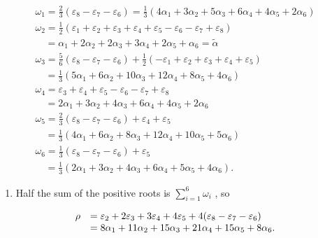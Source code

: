 \[
\begin{array}{l} \omega_ {1} = \frac {2}{3} (\varepsilon_ {8} - \varepsilon_ {7} - \varepsilon_ {6}) = \frac {1}{3} (4 \alpha_ {1} + 3 \alpha_ {2} + 5 \alpha_ {3} + 6 \alpha_ {4} + 4 \alpha_ {5} + 2 \alpha_ {6}) \\ \omega_ {2} = \frac {1}{2} (\varepsilon_ {1} + \varepsilon_ {2} + \varepsilon_ {3} + \varepsilon_ {4} + \varepsilon_ {5} - \varepsilon_ {6} - \varepsilon_ {7} + \varepsilon_ {8}) \\ \quad = \alpha_ {1} + 2 \alpha_ {2} + 2 \alpha_ {3} + 3 \alpha_ {4} + 2 \alpha_ {5} + \alpha_ {6} = \tilde {\alpha} \\ \omega_ {3} = \frac {5}{6} (\varepsilon_ {8} - \varepsilon_ {7} - \varepsilon_ {6}) + \frac {1}{2} (- \varepsilon_ {1} + \varepsilon_ {2} + \varepsilon_ {3} + \varepsilon_ {4} + \varepsilon_ {5}) \\ \quad = \frac {1}{3} (5 \alpha_ {1} + 6 \alpha_ {2} + 10 \alpha_ {3} + 12 \alpha_ {4} + 8 \alpha_ {5} + 4 \alpha_ {6}) \\ \omega_ {4} = \varepsilon_ {3} + \varepsilon_ {4} + \varepsilon_ {5} - \varepsilon_ {6} - \varepsilon_ {7} + \varepsilon_ {8} \\ \quad = 2 \alpha_ {1} + 3 \alpha_ {2} + 4 \alpha_ {3} + 6 \alpha_ {4} + 4 \alpha_ {5} + 2 \alpha_ {6} \\ \omega_ {5} = \frac {2}{3} (\varepsilon_ {8} - \varepsilon_ {7} - \varepsilon_ {6}) + \varepsilon_ {4} + \varepsilon_ {5} \\ \quad = \frac {1}{3} (4 \alpha_ {1} + 6 \alpha_ {2} + 8 \alpha_ {3} + 12 \alpha_ {4} + 10 \alpha_ {5} + 5 \alpha_ {6}) \\ \omega_ {6} = \frac {1}{3} (\varepsilon_ {8} - \varepsilon_ {7} - \varepsilon_ {6}) + \varepsilon_ {5} \\ \quad = \frac {1}{3} (2 \alpha_ {1} + 3 \alpha_ {2} + 4 \alpha_ {3} + 6 \alpha_ {4} + 5 \alpha_ {5} + 4 \alpha_ {6}). \end{array}
\]

\begin{enumerate}
\def\labelenumi{(\Roman{enumi})}
\setcounter{enumi}{6}
\tightlist
\item
  Half the sum of the positive roots is \(\sum_{i=1}^{6} \omega_i\) , so
\end{enumerate}

\[
\begin{array}{r l} \rho & = \varepsilon_ {2} + 2 \varepsilon_ {3} + 3 \varepsilon_ {4} + 4 \varepsilon_ {5} + 4 (\varepsilon_ {8} - \varepsilon_ {7} - \varepsilon_ {6}) \\ & = 8 \alpha_ {1} + 11 \alpha_ {2} + 15 \alpha_ {3} + 21 \alpha_ {4} + 15 \alpha_ {5} + 8 \alpha_ {6}. \end{array}
\]

